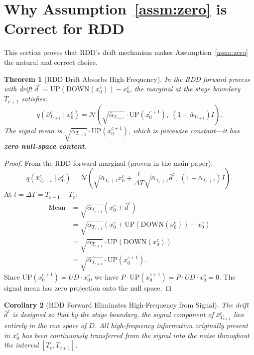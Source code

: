 \documentclass[11pt]{article}
\newtheorem{theorem}{Theorem}[section]
\newtheorem{corollary}[theorem]{Corollary}
\theoremstyle{remark}
\begin{document}
\section{Why Assumption~\ref{assm:zero} is Correct for RDD}

This section proves that RDD's drift mechanism makes Assumption~\ref{assm:zero} the natural and correct choice.

\begin{theorem}[RDD Drift Absorbs High-Frequency]\label{thm:drift}
In the RDD forward process with drift $\bar{d}^c = \mathrm{UP}(\mathrm{DOWN}(x_0^c)) - x_0^c$, the marginal at the stage boundary $T_{c+1}$ satisfies:
\begin{equation}
    q(\bar{x}_{T_{c+1}}^c \mid x_0^c) = \mathcal{N}\!\left(\sqrt{\bar{\alpha}_{T_{c+1}}} \cdot \mathrm{UP}(x_0^{c+1}),\; (1 - \bar{\alpha}_{T_{c+1}})I\right).
\end{equation}
The signal mean is $\sqrt{\bar{\alpha}_{T_{c+1}}} \cdot \mathrm{UP}(x_0^{c+1})$, which is piecewise constant---it has \textbf{zero null-space content}.
\end{theorem}

\begin{proof}
From the RDD forward marginal (proven in the main paper):
\begin{equation*}
    q(\bar{x}_{T_c+t}^c \mid x_0^c) = \mathcal{N}\!\left(\sqrt{\bar{\alpha}_{T_c+t}} x_0^c + \frac{t}{\Delta T}\sqrt{\bar{\alpha}_{T_c+t}} \bar{d}^c,\; (1-\bar{\alpha}_{T_c+t})I\right).
\end{equation*}
At $t = \Delta T = T_{c+1} - T_c$:
\begin{align*}
    \text{Mean} &= \sqrt{\bar{\alpha}_{T_{c+1}}}(x_0^c + \bar{d}^c) \\
    &= \sqrt{\bar{\alpha}_{T_{c+1}}}(x_0^c + \mathrm{UP}(\mathrm{DOWN}(x_0^c)) - x_0^c) \\
    &= \sqrt{\bar{\alpha}_{T_{c+1}}} \cdot \mathrm{UP}(\mathrm{DOWN}(x_0^c)) \\
    &= \sqrt{\bar{\alpha}_{T_{c+1}}} \cdot \mathrm{UP}(x_0^{c+1}).
\end{align*}
Since $\mathrm{UP}(x_0^{c+1}) = UD \cdot x_0^c$, we have $P \cdot \mathrm{UP}(x_0^{c+1}) = P \cdot UD \cdot x_0^c = 0$. The signal mean has zero projection onto the null space.
\end{proof}

\begin{corollary}[RDD Forward Eliminates High-Frequency from Signal]\label{cor:elimination}
The drift $\bar{d}^c$ is designed so that by the stage boundary, the signal component of $\bar{x}_{T_{c+1}}^c$ lies entirely in the row space of $D$. All high-frequency information originally present in $x_0^c$ has been continuously transferred from the signal into the noise throughout the interval $[T_c, T_{c+1}]$.
\end{corollary}
\end{document}
